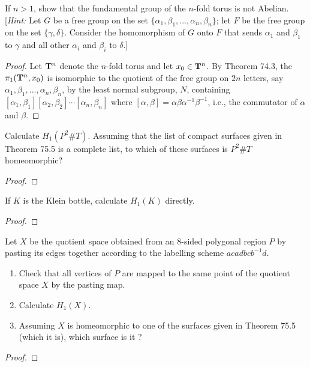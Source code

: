\begin{problem}[Munkres \S74, Ex.\,6]
If $n>1$, show that the fundamental group of the $n$-fold torus is not
Abelian. [\emph{Hint:} Let $G$ be a free group on the set
$\{\alpha_1,\beta_1,...,\alpha_n,\beta_n\}$; let $F$ be the free group on
the set $\{\gamma,\delta\}$. Consider the homomorphism of $G$ onto $F$ that
sends $\alpha_1$ and $\beta_1$ to $\gamma$ and all other $\alpha_i$ and
$\beta_i$ to $\delta$.]
\end{problem}
\begin{proof}
Let $\mathbf{T}^n$ denote the $n$-fold torus and let $x_0\in\mathbf{T}^n$. By Theorem
74.3, the $\pi_1(\mathbf{T}^n,x_0)$ is isomorphic to the quotient of the free
group on $2n$ letters, say $\alpha_1,\beta_1,...,\alpha_n,\beta_n$, by the
least normal subgroup, $N$, containing
$[\alpha_1,\beta_1][\alpha_2,\beta_2]\cdots[\alpha_n,\beta_n]$ where
$[\alpha,\beta]=\alpha\beta\alpha^{-1}\beta^{-1}$, i.e., the commutator of
$\alpha$ and $\beta$.
\end{proof}
\newpage
\begin{problem}[Munkres \S76, Ex.\,1]
Calculate $H_1(P^2\#T)$. Assuming that the list of compact surfaces given
in Theorem 75.5 is a complete list, to which of these surfaces is $P^2\#T$
homeomorphic?
\end{problem}
\begin{proof}
\end{proof}
\newpage
\begin{problem}[Munkres \S76, Ex.\,2]
If $K$ is the Klein bottle, calculate $H_1(K)$ directly.
\end{problem}
\begin{proof}
\end{proof}
\newpage
\begin{problem}[Munkres \S76, Ex.\,3(a,b,c)]
Let $X$ be the quotient space obtained from an $8$-sided polygonal region
$P$ by pasting its edges together according to the labelling scheme
$acadbcb^{-1}d$.
\begin{enumerate}[label=(\alph*)]
\item Check that all vertices of $P$ are mapped to the same point of the
  quotient space $X$ by the pasting map.
\item Calculate $H_1(X)$.
\item Assuming $X$ is homeomorphic to one of the surfaces given in Theorem
  75.5 (which it is), which surface is it ?
\end{enumerate}
\end{problem}
\begin{proof}
\end{proof}

